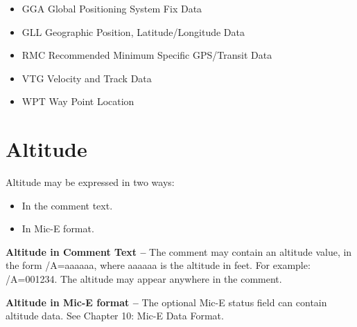 \begin{itemize}

\item GGA Global Positioning System Fix Data
\item GLL Geographic Position, Latitude/Longitude Data
\item RMC Recommended Minimum Specific GPS/Transit Data
\item VTG Velocity and Track Data
\item WPT Way Point Location

\end{itemize}

\section{Altitude}

Altitude may be expressed in two ways:

\begin{itemize}
\item In the comment text.
\item In Mic-E format.
\end{itemize}

\textbf{Altitude in Comment Text --} The comment may contain an altitude value,
in the form /A=aaaaaa, where aaaaaa is the altitude in feet. For example:
/A=001234. The altitude may appear anywhere in the comment.

\textbf{Altitude in Mic-E format --} The optional Mic-E status field can contain
altitude data. See Chapter 10: Mic-E Data Format.

